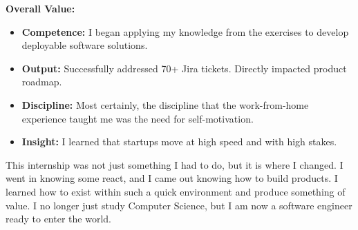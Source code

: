 \par \textbf{Overall Value:}
\begin{itemize}
    \item \textbf{Competence:} I began applying my knowledge from the exercises to develop deployable software solutions.
    \item \textbf{Output:} Successfully addressed 70+ Jira tickets. Directly impacted product roadmap.
    \item \textbf{Discipline:} Most certainly, the discipline that the work-from-home experience taught me was the need for self-motivation.
    \item \textbf{Insight:} I learned that startups move at high speed and with high stakes.
\end{itemize}

 \par This internship was not just something I had to do, but it is where I changed. I went in knowing some react, and I came out knowing how to build products. I learned how to exist within such a quick environment and produce something of value. I no longer just study Computer Science, but I am now a software engineer ready to enter the world.
